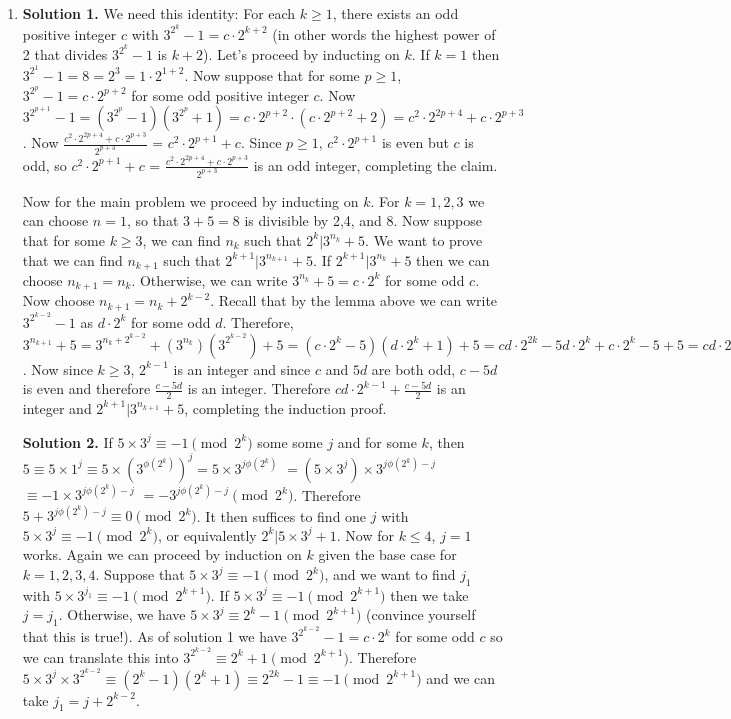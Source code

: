 \documentclass[11pt]{article}
\begin{document}
\begin{enumerate}
\item\textbf {Solution 1.} We need this identity: For each $k\ge 1$, there exists an odd positive integer $c$ with $3^{2^k}-1=c\cdot 2^{k+2}$ (in other words the highest power of 2 that divides $3^{2^k}-1$ is $k+2$). Let's proceed by inducting on $k$. If $k=1$ then $3^{2^1}-1=8=2^3=1\cdot 2^{1+2}$. Now suppose that for some $p\ge 1$, $3^{2^p}-1=c\cdot 2^{p+2}$ for some odd positive integer $c$. Now $3^{2^{p+1}}-1=(3^{2^p}-1)(3^{2^p}+1)=c\cdot 2^{p+2}\cdot(c\cdot 2^{p+2}+2) = c^2\cdot 2^{2p+4}+ c\cdot 2^{p+3}$. Now $\frac{c^2\cdot 2^{2p+4}+ c\cdot 2^{p+3}}{2^{p+3}}$ = $c^2\cdot 2^{p+1}+c.$ Since $p\ge 1$, $c^2\cdot 2^{p+1}$ is even but $c$ is odd, so $c^2\cdot 2^{p+1}+c$ = $\frac{c^2\cdot 2^{2p+4}+ c\cdot 2^{p+3}}{2^{p+3}}$ is an odd integer, completing the claim.

Now for the main problem we proceed by inducting on $k$. For $k=1,2,3$ we can choose $n=1$, so that $3+5=8$ is divisible by 2,4, and 8. Now suppose that for some $k\ge 3$, we can find $n_k$ such that $2^k|3^{n_k}+5$. We want to prove that we can find $n_{k+1}$ such that $2^{k+1}|3^{n_{k+1}}+5.$ If $2^{k+1}|3^{n_k}+5$ then we can choose $n_{k+1}=n_k$. Otherwise, we can write $3^{n_k}+5=c\cdot 2^k$ for some odd $c$. Now choose $n_{k+1}=n_k+2^{k-2}$. Recall that by the lemma above we can write $3^{2^{k-2}}-1$ as $d\cdot 2^k$ for some odd $d$. Therefore, $3^{n_{k+1}}+5=3^{n_k+2^{k-2}}+(3^{n_k})(3^{2^{k-2}})+5=(c\cdot 2^k-5)(d\cdot 2^k+1)+5=cd\cdot 2^{2k}-5d\cdot 2^k+c\cdot 2^k -5 +5 = cd\cdot 2^{2k}+(c-5d)\cdot 2^k = (2^{k+1})(cd\cdot 2^{k-1}+\frac{c-5d}{2})$. Now since $k\ge 3$, $2^{k-1}$ is an integer and since $c$ and $5d$ are both odd, $c-5d$ is even and therefore $\frac{c-5d}{2}$ is an integer. Therefore $cd\cdot 2^{k-1}+\frac{c-5d}{2}$ is an integer and $2^{k+1}|3^{n_{k+1}}+5$, completing the induction proof.

\textbf {Solution 2.} If $5\times 3^j\equiv -1\pmod {2^k}$ some some $j$ and for some $k$, then $5\equiv 5\times 1^j\equiv 5\times (3^{\phi (2^k)})^j=5\times 3^{j\phi (2^k)}$
$=(5\times 3^j) \times 3^{j\phi (2^k)-j}$
$\equiv -1\times  3^{j\phi (2^k)-j}$
$=-3^{j\phi (2^k)-j}\pmod {2^k}$.
Therefore $5+3^{j\phi (2^k)-j}\equiv 0\pmod {2^k}$. It then suffices to find one $j$ with $5\times 3^j\equiv -1\pmod {2^k}$, or equivalently $2^k|5\times 3^j+1$. Now for $k\le 4$, $j=1$ works. Again we can proceed by induction on $k$ given the base case for $k=1,2,3,4$. Suppose that $5\times 3^j\equiv -1\pmod {2^k}$, and we want to find $j_1$ with $5\times 3^{j_1}\equiv -1\pmod {2^{k+1}}.$ If $5\times 3^j\equiv -1\pmod {2^{k+1}}$ then we take $j=j_1$. Otherwise, we have $5\times 3^j\equiv 2^k-1\pmod {2^{k+1}}$ (convince yourself that this is true!). As of solution 1 we have $3^{2^{k-2}}-1=c\cdot 2^k$ for some odd $c$ so we can translate this into $3^{2^{k-2}}\equiv 2^k+1\pmod{2^{k+1}}$. Therefore $5\times 3^j\times 3^{2^{k-2}}\equiv (2^k-1)(2^k+1)\equiv 2^{2k}-1\equiv -1\pmod {2^{k+1}}$ and we can take $j_1=j+2^{k-2}$.
\end{enumerate}
\end{document}
